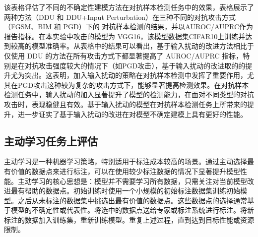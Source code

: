 \begin{table}[h]
        \captionsetup{font=small, justification=centering}
	\centering
        \renewcommand{\arraystretch}{1.0} %
	\caption{VGG16 + CIFAR10, 对抗样本的检测任务}
        \label{tag:adv detection}
\end{table}



该表格评估了不同的不确定性建模方法在对抗样本检测任务中的效果，表格展示了两种方法（DDU 和 DDU+Input Perturbation）在三种不同的对抗攻击方式（FGSM、BIM 和 PGD）下的 对抗样本检测的结果，并以AUROC/AUPRC作为报告指标。在本实验中攻击的模型为 VGG16，该模型数据集CIFAR10上训练并达到较高的模型准确率。从表格中的结果可以看出，基于输入扰动的改进方法相比于仅使用 DDU 的方法在所有攻击方式下都显著提高了 AUROC/AUPRC 指标，特别是在对抗攻击强度较大的情况下（如PGD攻击），基于输入扰动的改进取的的提升尤为突出。这表明，加入输入扰动的策略在对抗样本检测中发挥了重要作用，尤其在PGD攻击这种较为复杂的攻击方式下，能够显著提高检测效果。在对抗样本检测任务中，输入扰动的加入显著提升了模型的检测能力，在面对不同类型的对抗攻击时，表现稳健且有效。基于输入扰动的模型在对抗样本检测任务上所带来的提升，进一步证实了基于输入扰动的改进在对模型不确定建模上具有更好的性能。
\subsection{主动学习任务上评估}
主动学习是一种机器学习策略，特别适用于标注成本较高的场景。通过主动选择最有价值的数据点来进行标注，可以在使用较少标注数据的情况下显著提升模型性能。主动学习的核心思想是：模型并不需要学习所有数据，只需关注对当前模型改进最有帮助的数据点。初始训练时使用一个小规模的初始标注数据集训练初始模型。之后从未标注的数据集中挑选出最有价值的数据点。这些数据点的选择通常基于模型的不确定性或代表性。将选中的数据点送给专家或标注系统进行标注。将新标注的数据加入训练集，重新训练模型。重复上述过程，直到达到目标性能或资源限制。

